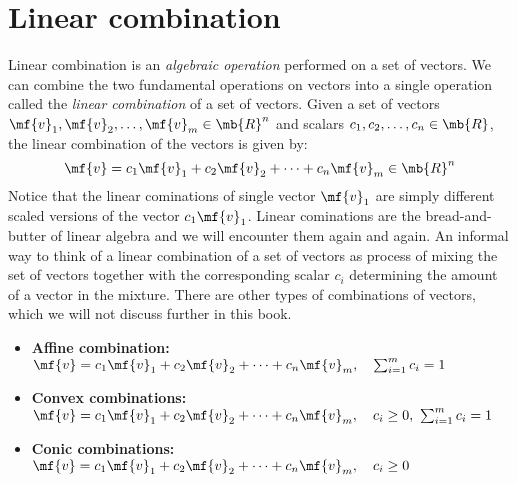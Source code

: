 \section{Linear combination}\label{sec:ch01-lincomb}
Linear combination is an \textit{algebraic operation} performed on a set of vectors. We can combine the two fundamental operations on vectors into a single operation called the \textit{linear combination} of a set of vectors. Given a set of vectors $\mf{v}_1, \mf{v}_2, \ldots, \mf{v}_m \in \mb{R}^n$ and scalars $c_1, c_2, \ldots, c_n \in \mb{R}$, the linear combination of the vectors is given by:
\begin{equation}
    \mf{v} = c_1 \mf{v}_1 + c_2 \mf{v}_2 + \cdots + c_n \mf{v}_m \in \mb{R}^n
    \label{eq:linear-comb}
\end{equation}
Notice that the linear cominations of single vector $\mf{v}_1$ are simply different scaled versions of the vector $c_1 \mf{v}_1$. Linear cominations are the bread-and-butter of linear algebra and we will encounter them again and again. An informal way to think of a linear combination of a set of vectors as process of mixing the set of vectors together with the corresponding scalar $c_i$ determining the amount of a vector in the mixture. There are other types of combinations of vectors, which we will not discuss further in this book.
\begin{itemize}
    \item \textbf{Affine combination:} $\mf{v} = c_1 \mf{v}_1 + c_2 \mf{v}_2 + \cdots + c_n \mf{v}_m, \quad \sum_{i=1}^{m} c_i = 1$
    \item \textbf{Convex combinations:} $\mf{v} = c_1 \mf{v}_1 + c_2 \mf{v}_2 + \cdots + c_n \mf{v}_m, \quad c_i \geq 0, \,\, \sum_{i=1}^{m} c_i = 1$
    \item \textbf{Conic combinations:} $\mf{v} = c_1 \mf{v}_1 + c_2 \mf{v}_2 + \cdots + c_n \mf{v}_m, \quad c_i \geq 0$
\end{itemize}

